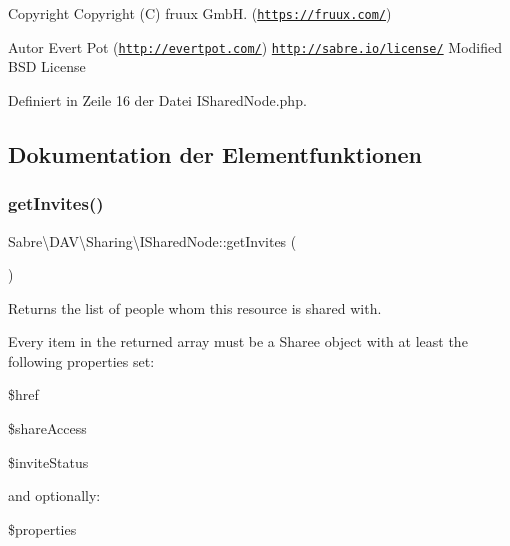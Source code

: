 \begin{DoxyCopyright}{Copyright}
Copyright (C) fruux GmbH. (\href{https://fruux.com/}{\tt https\+://fruux.\+com/}) 
\end{DoxyCopyright}
\begin{DoxyAuthor}{Autor}
Evert Pot (\href{http://evertpot.com/}{\tt http\+://evertpot.\+com/})  \href{http://sabre.io/license/}{\tt http\+://sabre.\+io/license/} Modified B\+SD License 
\end{DoxyAuthor}


Definiert in Zeile 16 der Datei I\+Shared\+Node.\+php.



\subsection{Dokumentation der Elementfunktionen}
\mbox{\label{interface_sabre_1_1_d_a_v_1_1_sharing_1_1_i_shared_node_aa4646ed6e564d50969a4117f0f03eecd}} 
\subsubsection{\texorpdfstring{get\+Invites()}{getInvites()}}
{\footnotesize\ttfamily Sabre\textbackslash{}\+D\+A\+V\textbackslash{}\+Sharing\textbackslash{}\+I\+Shared\+Node\+::get\+Invites (\begin{DoxyParamCaption}{ }\end{DoxyParamCaption})}

Returns the list of people whom this resource is shared with.

Every item in the returned array must be a Sharee object with at least the following properties set\+:


\begin{DoxyItemize}
\item \$href
\item \$share\+Access
\item \$invite\+Status
\end{DoxyItemize}

and optionally\+:


\begin{DoxyItemize}
\item \$properties
\end{DoxyItemize}

